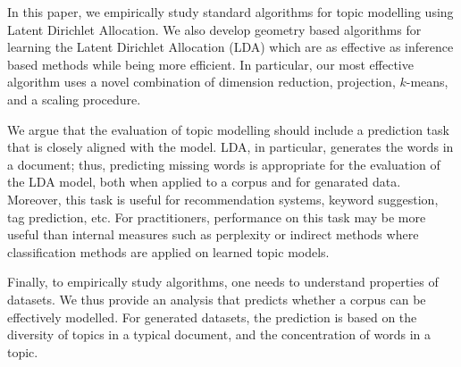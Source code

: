 In this paper, we empirically study standard algorithms for topic
modelling using Latent Dirichlet Allocation. We also develop geometry
based algorithms for learning the Latent Dirichlet Allocation (LDA)
which are as effective as inference based methods while being more
efficient. In particular, our most effective algorithm uses a novel
combination of dimension reduction, projection, $k$-means, and a
scaling procedure.

We argue that the evaluation of topic modelling should include a
prediction task that is closely aligned with the model. LDA, in
particular, generates the words in a document; thus, predicting
missing words is appropriate for the evaluation of the LDA model, both
when applied to a corpus and for genarated data.  Moreover, this task
is useful for recommendation systems, keyword suggestion, tag
prediction, etc.  For practitioners, performance on this task may be
more useful than internal measures such as perplexity or indirect
methods where classification methods are applied on  learned topic
models.

Finally, to empirically study algorithms, one needs to understand
properties of datasets.  We thus provide an analysis that predicts
whether a corpus can be effectively modelled.  For generated datasets,
the prediction is based on the diversity of topics in a typical
document, and the concentration of words in a topic.




